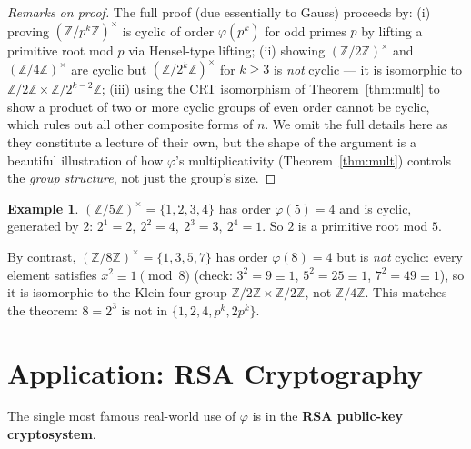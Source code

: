 \documentclass[11pt]{article}
\theoremstyle{definition}
\newtheorem{example}[theorem]{Example}
\theoremstyle{remark}
\newcommand{\Z}{\mathbb{Z}}
\begin{document}
\begin{proof}[Remarks on proof]
The full proof (due essentially to Gauss) proceeds by: (i) proving $(\Z/p^k\Z)^\times$ is cyclic of order $\varphi(p^k)$ for odd primes $p$ by lifting a primitive root mod $p$ via Hensel-type lifting; (ii) showing $(\Z/2\Z)^\times$ and $(\Z/4\Z)^\times$ are cyclic but $(\Z/2^k\Z)^\times$ for $k \ge 3$ is \emph{not} cyclic — it is isomorphic to $\Z/2\Z \times \Z/2^{k-2}\Z$; (iii) using the CRT isomorphism of Theorem~\ref{thm:mult} to show a product of two or more cyclic groups of even order cannot be cyclic, which rules out all other composite forms of $n$. We omit the full details here as they constitute a lecture of their own, but the shape of the argument is a beautiful illustration of how $\varphi$'s multiplicativity (Theorem~\ref{thm:mult}) controls the \emph{group structure}, not just the group's size.
\end{proof}

\begin{example}
$(\Z/5\Z)^\times = \{1,2,3,4\}$ has order $\varphi(5)=4$ and is cyclic, generated by $2$: $2^1=2,\ 2^2=4,\ 2^3=3,\ 2^4=1$. So $2$ is a primitive root mod $5$.

By contrast, $(\Z/8\Z)^\times = \{1,3,5,7\}$ has order $\varphi(8)=4$ but is \emph{not} cyclic: every element satisfies $x^2 \equiv 1 \pmod 8$ (check: $3^2=9\equiv1$, $5^2=25\equiv1$, $7^2=49\equiv1$), so it is isomorphic to the Klein four-group $\Z/2\Z\times\Z/2\Z$, not $\Z/4\Z$. This matches the theorem: $8 = 2^3$ is not in $\{1,2,4,p^k,2p^k\}$.
\end{example}

\section{Application: RSA Cryptography}

The single most famous real-world use of $\varphi$ is in the \textbf{RSA public-key cryptosystem}.
\end{document}
